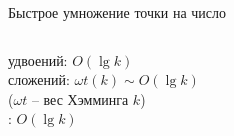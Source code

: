 \documentclass{beamer}
\begin{document}
\begin{frame}{Быстрое умножение точки на число}
\begin{columns}
\begin{column}{0.5\textwidth}
\begin{center}
\begin{tcolorbox}[enhanced,hbox,colback=box-blue-color!15,colframe=box-blue-color,title=Сложность,center title]
\begin{varwidth}{\textwidth}
							удвоений: $O(\lg k)$ \\
							сложений: $\omega t(k)\sim O (\lg k)$\\
							($\omega t$ -- вес Хэмминга $k$)\\
							: $O\left( {\lg k} \right)$
						\end{varwidth}
					\end{tcolorbox}	
				\end{center}
			\end{column}
		\end{columns}
	\end{frame}
	
\end{document}
